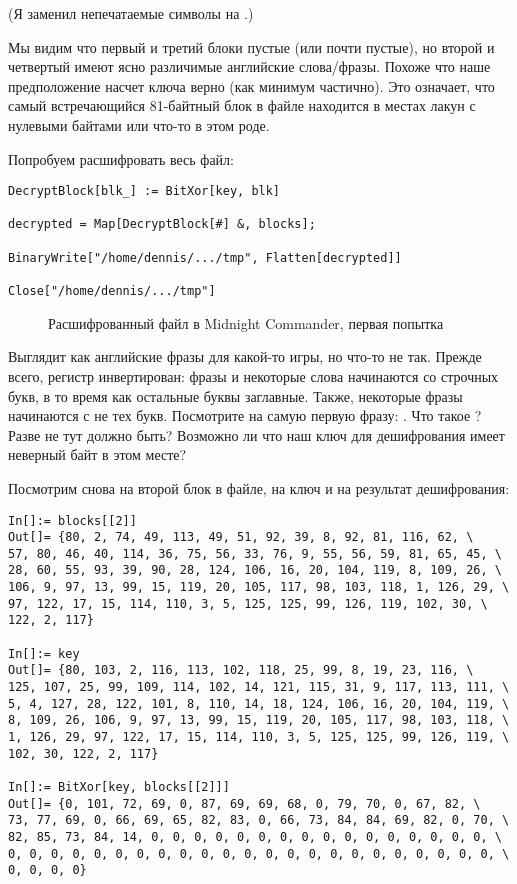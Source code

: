 (Я заменил непечатаемые символы на .)

Мы видим что первый и третий блоки пустые (или почти пустые),
но второй и четвертый имеют ясно различимые английские слова/фразы.
Похоже что наше предположение насчет ключа верно (как минимум частично).
Это означает, что самый встречающийся 81-байтный блок в файле находится в местах лакун с нулевыми байтами
или что-то в этом роде.

Попробуем расшифровать весь файл:

\begin{lstlisting}[style=custommath]
DecryptBlock[blk_] := BitXor[key, blk]

decrypted = Map[DecryptBlock[#] &, blocks];

BinaryWrite["/home/dennis/.../tmp", Flatten[decrypted]]

Close["/home/dennis/.../tmp"]
\end{lstlisting}

\begin{figure}[H]
\centering
{}
\caption{Расшифрованный файл в Midnight Commander, первая попытка}
\end{figure}

Выглядит как английские фразы для какой-то игры, но что-то не так.
Прежде всего, регистр инвертирован: фразы и некоторые слова начинаются со строчных букв,
в то время как остальные буквы заглавные.
Также, некоторые фразы начинаются с не тех букв.
Посмотрите на самую первую фразу: .
Что такое ? Разве не  тут должно быть?
Возможно ли что наш ключ для дешифрования имеет неверный байт в этом месте?

Посмотрим снова на второй блок в файле, на ключ и на результат дешифрования:

\begin{lstlisting}[style=custommath]
In[]:= blocks[[2]]
Out[]= {80, 2, 74, 49, 113, 49, 51, 92, 39, 8, 92, 81, 116, 62, \
57, 80, 46, 40, 114, 36, 75, 56, 33, 76, 9, 55, 56, 59, 81, 65, 45, \
28, 60, 55, 93, 39, 90, 28, 124, 106, 16, 20, 104, 119, 8, 109, 26, \
106, 9, 97, 13, 99, 15, 119, 20, 105, 117, 98, 103, 118, 1, 126, 29, \
97, 122, 17, 15, 114, 110, 3, 5, 125, 125, 99, 126, 119, 102, 30, \
122, 2, 117}

In[]:= key
Out[]= {80, 103, 2, 116, 113, 102, 118, 25, 99, 8, 19, 23, 116, \
125, 107, 25, 99, 109, 114, 102, 14, 121, 115, 31, 9, 117, 113, 111, \
5, 4, 127, 28, 122, 101, 8, 110, 14, 18, 124, 106, 16, 20, 104, 119, \
8, 109, 26, 106, 9, 97, 13, 99, 15, 119, 20, 105, 117, 98, 103, 118, \
1, 126, 29, 97, 122, 17, 15, 114, 110, 3, 5, 125, 125, 99, 126, 119, \
102, 30, 122, 2, 117}

In[]:= BitXor[key, blocks[[2]]]
Out[]= {0, 101, 72, 69, 0, 87, 69, 69, 68, 0, 79, 70, 0, 67, 82, \
73, 77, 69, 0, 66, 69, 65, 82, 83, 0, 66, 73, 84, 84, 69, 82, 0, 70, \
82, 85, 73, 84, 14, 0, 0, 0, 0, 0, 0, 0, 0, 0, 0, 0, 0, 0, 0, 0, 0, \
0, 0, 0, 0, 0, 0, 0, 0, 0, 0, 0, 0, 0, 0, 0, 0, 0, 0, 0, 0, 0, 0, 0, \
0, 0, 0, 0}
\end{lstlisting}

